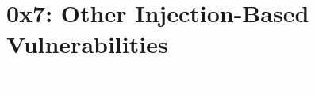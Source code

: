 \documentclass[aspectratio=169]{beamer}
\begin{document}
\section{0x7: Other Injection-Based Vulnerabilities}
{
\begin{frame}
\huge{\textcolor{white}{\textbf{0x7: Other Injection-Based Vulnerabilities}}}
\end{frame}
}
\end{document}
